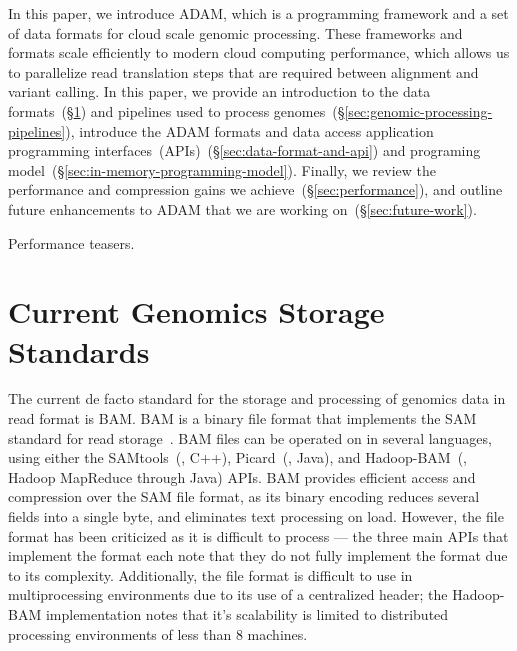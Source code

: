 \documentclass[10pt,twocolumn]{article}
\begin{document}
In this paper, we introduce ADAM, which is a programming framework and a set of data formats for cloud scale genomic
processing. These frameworks and formats scale efficiently to modern cloud computing performance, which allows us to
parallelize read translation steps that are required between alignment and variant calling. In this paper, we provide an
introduction to the data formats~(\S\ref{sec:current-genomics-storage-standards}) and pipelines used to process
genomes~(\S\ref{sec:genomic-processing-pipelines}), introduce the ADAM formats and data access
application programming interfaces~(APIs)~(\S\ref{sec:data-format-and-api}) and programing
model~(\S\ref{sec:in-memory-programming-model}). Finally, we review the performance and compression gains we
achieve~(\S\ref{sec:performance}), and outline future enhancements to ADAM that we are working on~(\S\ref{sec:future-work}).

Performance teasers.

\section{Current Genomics Storage Standards}
\label{sec:current-genomics-storage-standards}

The current de facto standard for the storage and processing of genomics data in read format is BAM. BAM is a binary file
format that implements the SAM standard for read storage~\cite{li09}. BAM files can be operated on in several languages,
using either the SAMtools~(\cite{li09}, C++), Picard~(\cite{picard}, Java), and Hadoop-BAM~(\cite{niemenmaa12}, Hadoop
MapReduce through Java) APIs. BAM provides efficient access and compression over the SAM file format, as its binary
encoding reduces several fields into a single byte, and eliminates text processing on load. However, the file format has been
criticized as it is difficult to process --- the three main APIs that implement the format each note that they do not fully implement
the format due to its complexity. Additionally, the file format is difficult to use in multiprocessing environments due to its use
of a centralized header; the Hadoop-BAM implementation notes that it's scalability is limited to distributed processing
environments of less than 8 machines.
\end{document}
